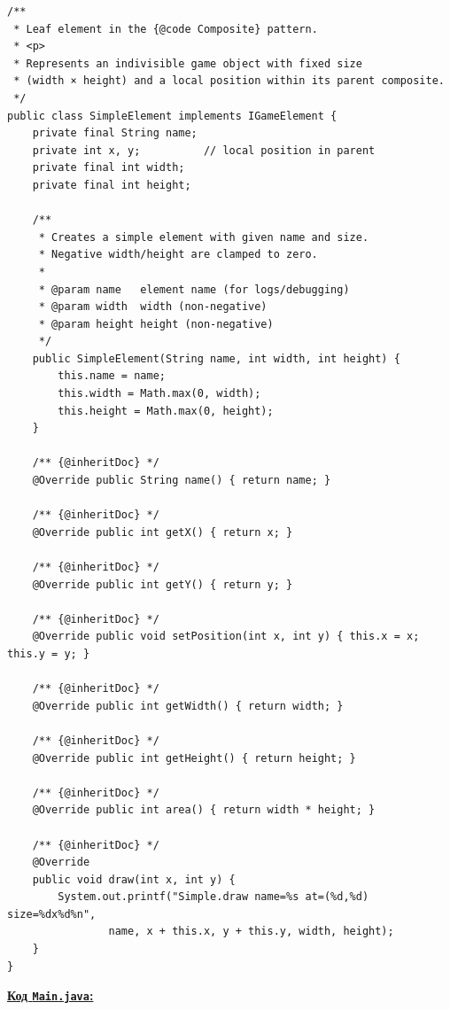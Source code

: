 \documentclass[12pt,a4paper]{article}
\begin{document}
    \begin{verbatim}
/**
 * Leaf element in the {@code Composite} pattern.
 * <p>
 * Represents an indivisible game object with fixed size
 * (width × height) and a local position within its parent composite.
 */
public class SimpleElement implements IGameElement {
    private final String name;
    private int x, y;          // local position in parent
    private final int width;
    private final int height;

    /**
     * Creates a simple element with given name and size.
     * Negative width/height are clamped to zero.
     *
     * @param name   element name (for logs/debugging)
     * @param width  width (non-negative)
     * @param height height (non-negative)
     */
    public SimpleElement(String name, int width, int height) {
        this.name = name;
        this.width = Math.max(0, width);
        this.height = Math.max(0, height);
    }

    /** {@inheritDoc} */
    @Override public String name() { return name; }

    /** {@inheritDoc} */
    @Override public int getX() { return x; }

    /** {@inheritDoc} */
    @Override public int getY() { return y; }

    /** {@inheritDoc} */
    @Override public void setPosition(int x, int y) { this.x = x; this.y = y; }

    /** {@inheritDoc} */
    @Override public int getWidth() { return width; }

    /** {@inheritDoc} */
    @Override public int getHeight() { return height; }

    /** {@inheritDoc} */
    @Override public int area() { return width * height; }

    /** {@inheritDoc} */
    @Override
    public void draw(int x, int y) {
        System.out.printf("Simple.draw name=%s at=(%d,%d) size=%dx%d%n",
                name, x + this.x, y + this.y, width, height);
    }
}
    \end{verbatim}

    \textbf{\underline{Код \texttt{Main.java}:}}
\end{document}
